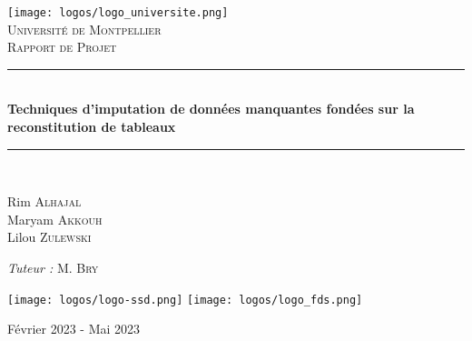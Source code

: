 \documentclass[12pt, openany, fleqn, french]{article}
\newcommand{\HRule}{\rule{\linewidth}{0.5mm}}
\begin{document}
\begin{titlepage}
  \begin{sffamily}
  \begin{center}

    \texttt{[image: logos/logo\_universite.png]}~\\[1.5cm] 
    \textsc{\LARGE Université de Montpellier}\\[1cm]
    \textsc{\large Rapport de Projet}\\[1.5cm]
    
    \HRule \\[0.4cm]
    { \huge \bfseries Techniques d'imputation de données manquantes fondées sur la reconstitution de tableaux\\[0.4cm] }

    \HRule \\[1.5cm]

    \begin{minipage}{0.4\textwidth}
      \begin{flushleft} \large
        Rim \textsc{Alhajal}\\
        Maryam \textsc{Akkouh}\\
        Lilou \textsc{Zulewski}\\
      \end{flushleft}
    \end{minipage}
    \begin{minipage}{0.4\textwidth}
      \begin{flushright} \large
        \emph{Tuteur :} M. \textsc{Bry}\\
      \end{flushright}
    \end{minipage}

    \vfill

    \begin{center}
        \texttt{[image: logos/logo-ssd.png]}
        \hfill
        \texttt{[image: logos/logo\_fds.png]}
    \end{center}

    {\large Février 2023 - Mai 2023}

  \end{center}
  \end{sffamily}
\end{titlepage}
\end{document}
